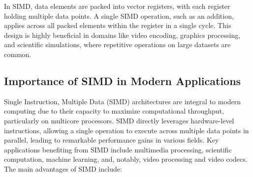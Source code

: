 \documentclass[12pt,a4paper]{article}
\begin{document}
In SIMD, data elements are packed into vector registers, with each register holding multiple data points. A single SIMD operation, such as an addition, applies across all packed elements within the register in a single cycle. This design is highly beneficial in domains like video encoding, graphics processing, and scientific simulations, where repetitive operations on large datasets are common.
\subsection{Importance of SIMD in Modern Applications}

Single Instruction, Multiple Data (SIMD) architectures are integral to modern computing due to their capacity to maximize computational throughput, particularly on multicore processors. SIMD directly leverages hardware-level instructions, allowing a single operation to execute across multiple data points in parallel, leading to remarkable performance gains in various fields. Key applications benefiting from SIMD include multimedia processing, scientific computation, machine learning, and, notably, video processing and video codecs. 
\\

The main advantages of SIMD include:
\end{document}
